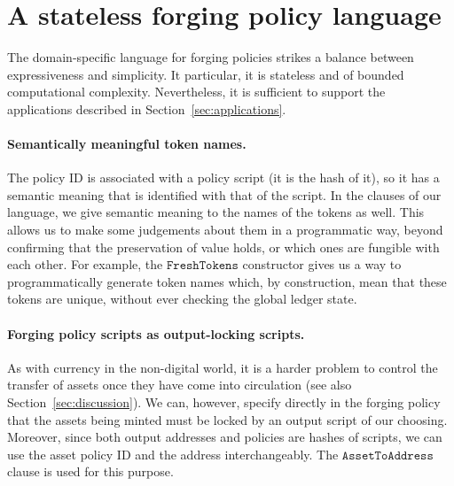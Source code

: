 \section{A stateless forging policy language}
\label{sec:fps-language}

The domain-specific language for forging policies strikes a balance between expressiveness and simplicity. It particular, it is stateless and of bounded computational complexity. Nevertheless, it is sufficient to support the applications described in Section~\ref{sec:applications}.

\paragraph{Semantically meaningful token names.}

The policy ID is associated with a policy script (it is the hash of it),
so it has a semantic meaning that is identified with that of the script.
In the clauses of our language, we give semantic meaning
to the names of the tokens as well. This allows us to make some
judgements about them in a programmatic way, beyond confirming that the
preservation of value holds, or
which ones are fungible with each other.
For example, the $\texttt{FreshTokens}$ constructor gives us a way to programmatically generate
token names which, by construction, mean that these tokens are unique, without
ever checking the global ledger state.

\paragraph{Forging policy scripts as output-locking scripts.}

As with
currency in the non-digital world, it is a harder problem to control the transfer of assets once
they have come into circulation (see also Section~\ref{sec:discussion}). We can, however,
specify directly in the forging policy that the assets being minted must
be locked by an output script of our choosing.
Moreover, since both output addresses and policies are hashes of scripts,
we can use the asset policy ID and the address interchangeably.
The $\texttt{AssetToAddress}$ clause is used for this purpose.

